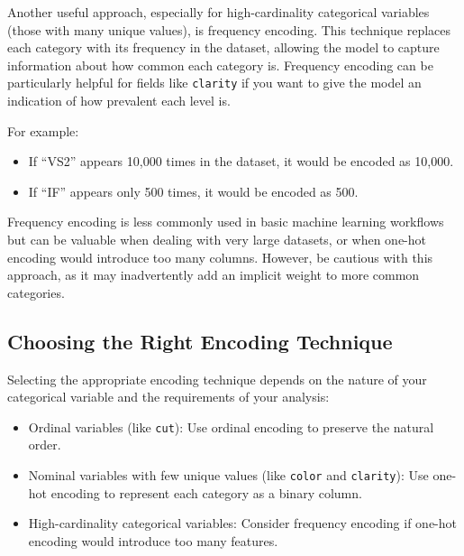 \documentclass[
  11pt,
]{book}
\providecommand{\tightlist}{%
  \setlength{\itemsep}{0pt}\setlength{\parskip}{0pt}}
\theoremstyle{definition}
\theoremstyle{definition}
\theoremstyle{definition}
\theoremstyle{definition}
\theoremstyle{remark}
\begin{document}
Another useful approach, especially for high-cardinality categorical variables (those with many unique values), is frequency encoding. This technique replaces each category with its frequency in the dataset, allowing the model to capture information about how common each category is. Frequency encoding can be particularly helpful for fields like \texttt{clarity} if you want to give the model an indication of how prevalent each level is.

For example:

\begin{itemize}
\tightlist
\item
  If ``VS2'' appears 10,000 times in the dataset, it would be encoded as 10,000.
\item
  If ``IF'' appears only 500 times, it would be encoded as 500.
\end{itemize}

Frequency encoding is less commonly used in basic machine learning workflows but can be valuable when dealing with very large datasets, or when one-hot encoding would introduce too many columns. However, be cautious with this approach, as it may inadvertently add an implicit weight to more common categories.

\subsection{Choosing the Right Encoding Technique}\label{choosing-the-right-encoding-technique}

Selecting the appropriate encoding technique depends on the nature of your categorical variable and the requirements of your analysis:

\begin{itemize}
\tightlist
\item
  Ordinal variables (like \texttt{cut}): Use ordinal encoding to preserve the natural order.
\item
  Nominal variables with few unique values (like \texttt{color} and \texttt{clarity}): Use one-hot encoding to represent each category as a binary column.
\item
  High-cardinality categorical variables: Consider frequency encoding if one-hot encoding would introduce too many features.
\end{itemize}
\end{document}
